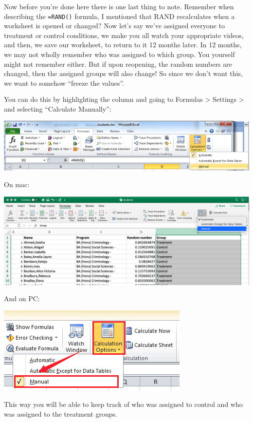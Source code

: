 \documentclass[
]{book}
\begin{document}
Now before you're done here there is one last thing to note. Remember when describing the \texttt{=RAND()} formula, I mentioned that RAND recalculates when a worksheet is opened or changed? Now let's say we've assigned everyone to treatment or control conditions, we make you all watch your appropriate videos, and then, we save our worksheet, to return to it 12 months later. In 12 months, we may not wholly remember who was assigned to which group. You yourself might not remember either. But if upon reopening, the random numbers are changed, then the assigned groups will also change! So since we don't want this, we want to somehow ``freeze the values''.

You can do this by highlighting the column and going to Formulas \textgreater{} Settings \textgreater{} and selecting ``Calculate Manually'':

\includegraphics{imgs/calc_man_pc.png}

On mac:

\includegraphics{imgs/calc_man.png}

And on PC:

\includegraphics{imgs/pc_manual_calc_opt_2.png}

This way you will be able to keep track of who was assigned to control and who was assigned to the treatment groups.
\end{document}
